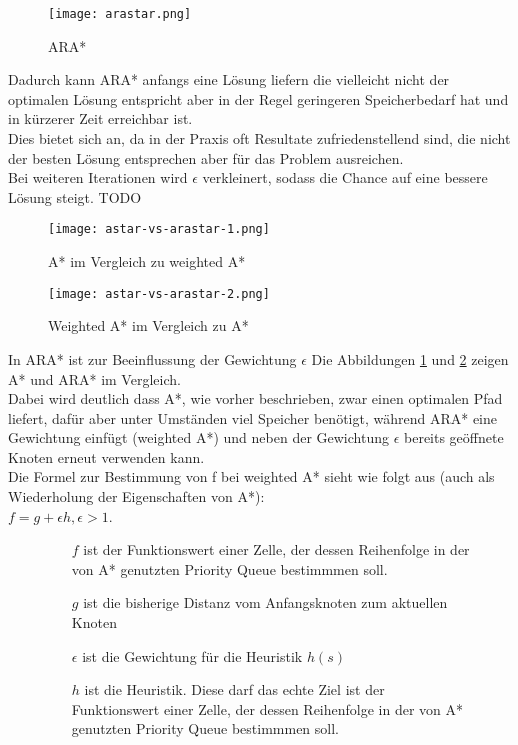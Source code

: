 \documentclass[oribibl]{llncs}
\begin{document}
\begin{figure}
	\centering
  \texttt{[image: arastar.png]}
	\caption{ARA*}
	\cite{SBPLRosSchool}
\end{figure}
Dadurch kann ARA* anfangs eine Lösung liefern die vielleicht nicht der optimalen Lösung entspricht aber in der Regel geringeren Speicherbedarf hat und in kürzerer Zeit erreichbar ist.\\
Dies bietet sich an, da in der Praxis oft Resultate zufriedenstellend sind, die nicht der besten Lösung entsprechen aber für das Problem ausreichen.\\
Bei weiteren Iterationen wird $\epsilon$ verkleinert, sodass die Chance auf eine bessere Lösung steigt.
TODO
\newpage
\begin{figure}
	\centering
  \texttt{[image: astar-vs-arastar-1.png]}
	\caption{A* im Vergleich zu weighted A*}
	\cite{SBPLRosSchool}
	\label{astarvsarastar1}
\end{figure}
\begin{figure}
	\centering
  \texttt{[image: astar-vs-arastar-2.png]}
	\caption{Weighted A* im Vergleich zu A*}
	\cite{SBPLRosSchool}
	\label{astarvsarastar2}
\end{figure}
\clearpage
\newpage
In ARA* ist zur Beeinflussung der Gewichtung $\epsilon$ Die Abbildungen \ref{astarvsarastar1} und \ref{astarvsarastar2} zeigen A* und ARA* im Vergleich.\\
Dabei wird deutlich dass A*, wie vorher beschrieben, zwar einen optimalen Pfad liefert, dafür aber unter Umständen viel Speicher benötigt, während ARA* eine Gewichtung einfügt (weighted A*) und neben der Gewichtung $\epsilon$ bereits geöffnete Knoten erneut verwenden kann.\\
Die Formel zur Bestimmung von f bei weighted A* sieht wie folgt aus (auch als Wiederholung der Eigenschaften von A*):\\
$f = g + \epsilon h, \epsilon > 1$.
\begin{figure}
\begin{itemize}
\item [$f$] ist der Funktionswert einer Zelle, der dessen Reihenfolge in der von A* genutzten Priority Queue bestimmmen soll.
\item [$g$] ist die bisherige Distanz vom Anfangsknoten zum aktuellen Knoten
\item [$\epsilon$] ist die Gewichtung für die Heuristik $h(s)$
\item [$h$] ist die Heuristik. Diese darf das echte Ziel ist der Funktionswert einer Zelle, der dessen Reihenfolge in der von A* genutzten Priority Queue bestimmmen soll.
\end{itemize}
\end{figure}
\end{document}
